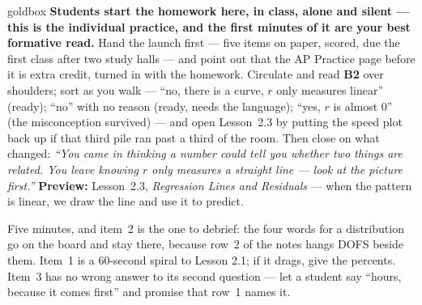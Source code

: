 \documentclass[10pt]{article}
\begin{document}
\boxguard
\begin{skillbox}{goldbox}
\textbf{Students start the homework here, in class, alone and silent --- this is the individual
practice, and the first minutes of it are your best formative read.} Hand the launch first ---
five items on paper, scored, due the first class after two study halls --- and point out that
the AP Practice page before it is extra credit, turned in with the homework. Circulate and read
\textbf{B2} over shoulders; sort as you walk --- ``no, there is a curve, $r$ only measures
linear'' (ready); ``no'' with no reason (ready, needs the language); ``yes, $r$ is almost 0''
(the misconception survived) --- and open Lesson~2.3 by putting the speed plot back up if that
third pile ran past a third of the room. Then close on what changed: \emph{``You came in
thinking a number could tell you whether two things are related. You leave knowing $r$ only
measures a straight line --- look at the picture first.''} \textbf{Preview:} Lesson~2.3,
\emph{Regression Lines and Residuals} --- when the pattern is linear, we draw the line and
use it to predict.
\end{skillbox}

\begin{teachernote}[Warm-Up]
Five minutes, and item~2 is the one to debrief: the four words for a distribution go on the
board and stay there, because row~2 of the notes hangs DOFS beside them. Item~1 is a 60-second
spiral to Lesson 2.1; if it drags, give the percents. Item~3 has no wrong answer to its second
question --- let a student say ``hours, because it comes first'' and promise that row~1 names it.
\end{teachernote}
\end{document}

